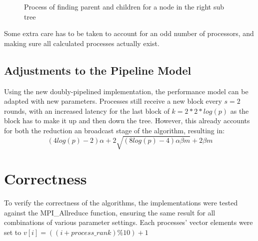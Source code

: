 \documentclass[twoside,twocolumn,hidelinks]{article}
\begin{document}
\begin{figure}
      \centering
      \caption{Process of finding parent and children for a node in the right sub tree}
      \label{fig:dual_tree_translation}
\end{figure}

Some extra care has to be taken to account for an odd number of processors, and making sure all calculated processes actually exist.

\subsection{Adjustments to the Pipeline Model}
Using the new doubly-pipelined implementation, the performance model can be adapted with new parameters. Processes still receive a new block every $s=2$ rounds, with an increased latency for the last block of $k=2*2*log(p)$ as the block has to make it up and then down the tree. However, this already accounts for both the reduction an broadcast stage of the algorithm, resulting in:
\begin{equation}
      (4log(p)-2)\alpha + 2\sqrt{(8log(p)-4)\alpha\beta m} + 2\beta m
\end{equation}

\section{Correctness}
To verify the correctness of the algorithms, the implementations were tested against the MPI\_Allreduce function, ensuring the same result for all combinations of various parameter settings. Each processes' vector elements were set to $v[i] = ((i + process\_rank) \% 10) + 1$
\end{document}
